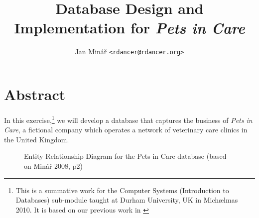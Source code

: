 \documentclass[10pt]{article}
\author{Jan Minář {\tt <rdancer@rdancer.org>}}
\title{Database Design and Implementation for {\em Pets in Care}}
\begin{document}


\maketitle



\section{Abstract}
\thispagestyle{fancy}

In this exercise,\footnote{This is a summative work for the Computer Systems (Introduction to Databases) sub-module taught at Durham University, UK in Michælmas 2010.  It is based on our previous work in \cite{minarcsys}} we will develop a database that captures the business of {\em Pets in Care}, a fictional company which operates a network of veterinary care clinics in the United Kingdom.


\begin{figure}

    \noindent

    \caption{
	Entity Relationship Diagram for the Pets in Care database (based on Minář 2008, p2)
    }
    \label{flowchart}
\end{figure}
\end{document}
